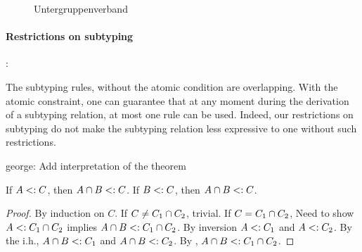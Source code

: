 \documentclass[nocopyrightspace,preprint,times,9pt]{sigplanconf}
\newcommand{\authornote}[3]{{\color{#2} {\sc #1}: #3}}
\newcommand\george[1]{\authornote{george}{blue}{#1}}
\begin{document}
\begin{figure}

\centering
\newcommand{\mydistance}{.6cm}
\caption{Untergruppenverband}
\end{figure}

\paragraph{Restrictions on subtyping}:

The subtyping rules, without the atomic condition are overlapping. With the atomic constraint, one can guarantee that at any moment during the derivation of a subtyping relation, at most one rule can be used. Indeed, our restrictions on subtyping do not make the subtyping relation less expressive to one without such restrictions.

\george{Add interpretation of the theorem}

\begin{theorem}
  If $A <: C$, then $A \cap B <: C$.
  If $B <: C$, then $A \cap B <: C$.
\end{theorem}

\begin{proof}
  By induction on $C$.
  If $C \neq C_1 \cap C_2$, trivial.
  If $C = C_1 \cap C_2$,
  Need to show $A <: C_1 \cap C_2$ implies $A \cap B <: C_1 \cap C_2$.
  By inversion $A <: C_1$ and $A <: C_2$.
  By the i.h., $A \cap B <: C_1$ and $A \cap B <: C_2$.
  By , $A \cap B <: C_1 \cap C_2$.
\end{proof}
\end{document}
